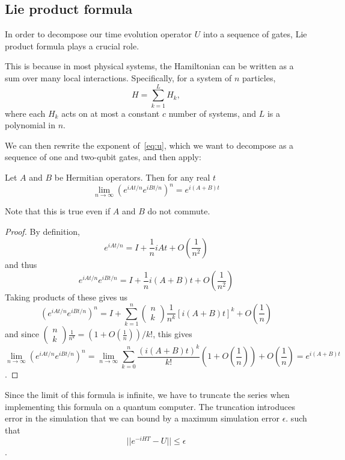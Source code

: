 \subsection{Lie product formula}
In order to decompose our time evolution operator $U$ into a sequence of gates, Lie product formula plays a crucial role.

This is because in most physical systems, the Hamiltonian
can be written as a sum over many local interactions. Specifically, for a system of $n$
particles,
\begin{equation}
H=\sum_{k=1}^{L} H_{k},
\end{equation}
where each $H_{k}$ acts on at most a constant $c$ number of systems, and $L$ is a polynomial in $n$.

We can then rewrite the exponent of~\ref{eq:u}, which we want to decompose as a sequence of one and two-qubit gates, and then apply:

\begin{theorem}Let $A$ and $B$ be Hermitian operators. Then for any real $t$
\begin{equation}
\lim _{n \rightarrow \infty}\left(e^{i A t / n} e^{i B t / n}\right)^{n}=e^{i(A+B) t}
\end{equation}\cite{NielsenChuang}
\end{theorem}
Note that this is true even if $A$ and $B$ do not commute.
\begin{proof}
By definition,
$$
e^{i A t / n}=I+\frac{1}{n} i A t+O\left(\frac{1}{n^{2}}\right)
$$
and thus
$$
e^{i A t / n} e^{i B t / n}=I+\frac{1}{n} i(A+B) t+O\left(\frac{1}{n^{2}}\right)
$$
Taking products of these gives us
$$
\left(e^{i A t / n} e^{i B t / n}\right)^{n}=I+\sum_{k=1}^{n}\left(\begin{array}{c}
n \\
k
\end{array}\right) \frac{1}{n^{k}}[i(A+B) t]^{k}+O\left(\frac{1}{n}\right)
$$
and since $\left(\begin{array}{c}n \\ k\end{array}\right) \frac{1}{n^{k}}=\left(1+O\left(\frac{1}{n}\right)\right) / k !$, this gives
$$
\lim _{n \rightarrow \infty}\left(e^{i A t / n} e^{i B t / n}\right)^{n}=\lim _{n \rightarrow \infty} \sum_{k=0}^{n} \frac{(i(A+B) t)^{k}}{k !}\left(1+O\left(\frac{1}{n}\right)\right)+O\left(\frac{1}{n}\right)=e^{i(A+B) t}
$$.
\end{proof}


Since the limit of this formula is infinite, we have to truncate the series when implementing this formula on a quantum computer. The truncation introduces error in the simulation that we can bound by a maximum simulation error $\epsilon$.
such that 
\begin{equation*}
|| e^{-iHT} - U || \leq \epsilon
\end{equation*}.

